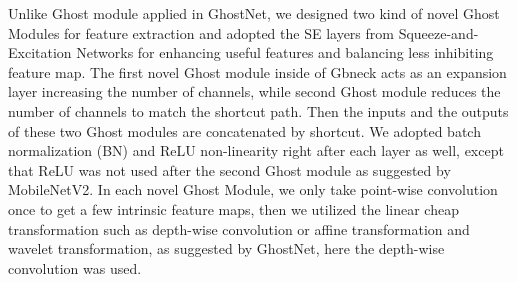Unlike Ghost module applied in GhostNet\cite{b19}, we designed two kind of novel Ghost Modules for feature extraction and adopted the SE layers from Squeeze-and-Excitation Networks \cite{b24} for enhancing useful features and balancing less inhibiting feature map. The first novel Ghost module inside of Gbneck acts as an expansion layer increasing the number of channels, while second Ghost module reduces the number of channels to match the shortcut path. Then the inputs and the outputs of these two Ghost modules are concatenated by shortcut. We adopted batch normalization (BN) and ReLU non-linearity right after each layer as well\cite{b19}, except that ReLU was not used after the second Ghost module as suggested by MobileNetV2\cite{b30}. In each novel Ghost Module, we only take point-wise convolution once to get a few intrinsic feature maps, then we utilized the linear cheap transformation such as depth-wise convolution or affine transformation and wavelet transformation, as suggested by GhostNet\cite{b19}, here the depth-wise convolution was used.

